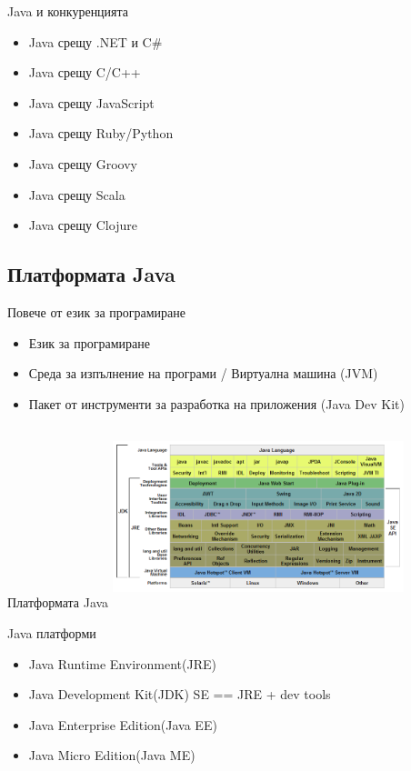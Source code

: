 \documentclass{beamer}
\begin{document}
\begin{frame}{Java и конкуренцията}
  \transdissolve
  \begin{itemize}
    \item Java срещу .NET и C\#
    \item Java срещу C/C++
    \item Java срещу JavaScript
    \item Java срещу Ruby/Python
    \item Java срещу Groovy
    \item Java срещу Scala
    \item Java срещу Clojure
  \end{itemize}
\end{frame}

\subsection{Платформата Java}

\begin{frame}{Повече от език за програмиране}
  \transdissolve
  \begin{itemize}
    \item Език за програмиране
    \item Среда за изпълнение на програми / Виртуална машина (JVM)
    \item Пакет от инструменти за разработка на приложения (Java Dev Kit)
  \end{itemize}

\end{frame}

\begin{frame}{Платформата Java}
  \transdissolve
  \includegraphics[height=200px, width=320px]{images/JavaPlatform.png}
\end{frame}


\begin{frame}{Java платформи}
  \transdissolve
  \begin{itemize}
    \item Java Runtime Environment(JRE)
    \item Java Development Kit(JDK) SE == JRE + dev tools
    \item Java Enterprise Edition(Java EE)
    \item Java Micro Edition(Java ME)
  \end{itemize}
\end{frame}
\end{document}
